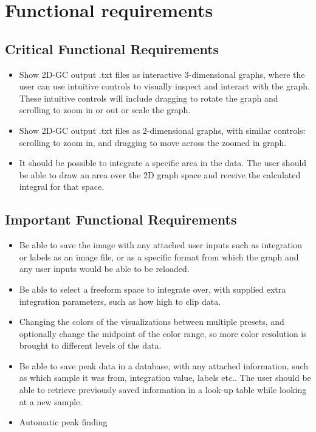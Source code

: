\documentclass{article}
\begin{document}
\section{Functional requirements}
\subsection*{Critical Functional Requirements}
\begin{itemize}
	\item Show 2D-GC output .txt files as interactive 3-dimensional graphs, where the user can use intuitive controls to visually inspect and interact with the graph. These intuitive controls will include dragging to rotate the graph and scrolling to zoom in or out or scale the graph. 
	\item Show 2D-GC output .txt files as 2-dimensional graphs, with similar controls: scrolling to zoom in, and dragging to move across the zoomed in graph. 
    \item It should be possible to integrate a specific area in the data. The user should be able to draw an area over the 2D graph space and receive the calculated integral for that space. 
\end{itemize}

\subsection*{Important Functional Requirements}
\begin{itemize}
    \item Be able to save the image with any attached user inputs such as integration or labels as an image file, or as a specific format from which the graph and any user inputs would be able to be reloaded. 
	\item Be able to select a freeform space to integrate over, with supplied extra integration parameters, such as how high to clip data.
	\item Changing the colors of the visualizations between multiple presets, and optionally change the midpoint of the color range, so more color resolution is brought to different levels of the data. 
    \item Be able to save peak data in a database, with any attached information, such as which sample it was from, integration value, labels etc.. The user should be able to retrieve previously saved information in a look-up table while looking at a new sample.
	\item Automatic peak finding
\end{itemize}
\end{document}
